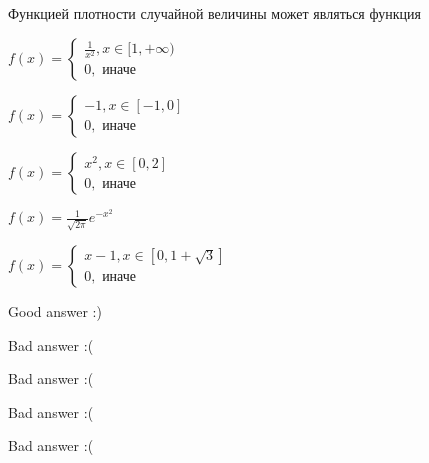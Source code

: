 
\begin{question}
Функцией плотности случайной величины может являться функция
\begin{answerlist}
  \item \(f(x) = \begin{cases} \frac{1}{x^2}, x \in [1,+ \infty) \\ 0,\text{ иначе} \end{cases}\)
  \item \(f(x) = \begin{cases} -1, x \in [-1, 0] \\ 0,\text{ иначе} \end{cases}\)
  \item \(f(x) = \begin{cases} x^2, x \in [0,2] \\ 0,\text{ иначе} \end{cases}\)
  \item \(f(x) = \frac{1}{\sqrt{2\pi}} e^{-x^2}\)
  \item \(f(x) = \begin{cases} x - 1, x \in [0,1+\sqrt{3}] \\ 0,\text{ иначе} \end{cases}\)
\end{answerlist}
\end{question}

\begin{solution}
\begin{answerlist}
  \item Good answer :)
  \item Bad answer :(
  \item Bad answer :(
  \item Bad answer :(
  \item Bad answer :(
\end{answerlist}
\end{solution}

